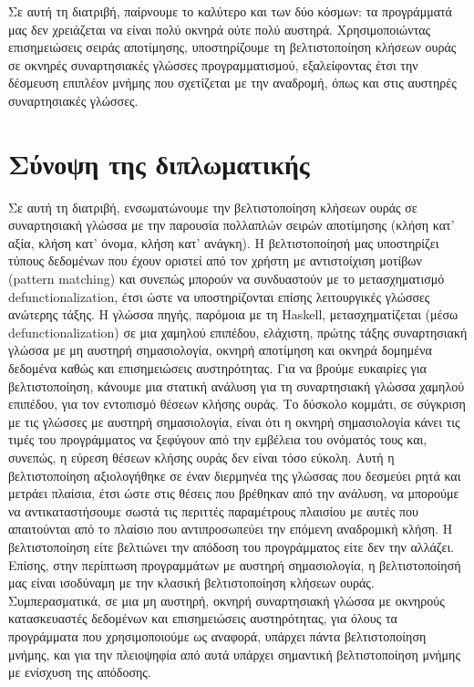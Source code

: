 \documentclass[diploma]{softlab-thesis}
\begin{document}
Σε αυτή τη διατριβή, παίρνουμε το καλύτερο και των δύο κόσμων: τα προγράμματά μας δεν χρειάζεται 
να είναι πολύ οκνηρά ούτε πολύ αυστηρά. Χρησιμοποιώντας επισημειώσεις σειράς αποτίμησης, υποστηρίζουμε τη 
βελτιστοποίηση κλήσεων ουράς σε οκνηρές
συναρτησιακές γλώσσες προγραμματισμού, εξαλείφοντας έτσι την δέσμευση επιπλέον μνήμης που σχετίζεται 
με την αναδρομή, όπως και στις αυστηρές συναρτησιακές γλώσσες.  


\section{Σύνοψη της διπλωματικής}

Σε αυτή τη διατριβή, ενσωματώνουμε την βελτιστοποίηση κλήσεων ουράς σε συναρτησιακή
γλώσσα με την παρουσία πολλαπλών σειρών αποτίμησης (κλήση κατ' αξία, κλήση κατ' όνομα, κλήση κατ' ανάγκη).
Η βελτιστοποίησή μας υποστηρίζει τύπους δεδομένων που έχουν οριστεί από τον χρήστη με αντιστοίχιση 
μοτίβων (pattern matching) και συνεπώς μπορούν να συνδυαστούν με το
μετασχηματισμό defunctionalization, έτσι ώστε να υποστηρίζονται επίσης λειτουργικές γλώσσες ανώτερης τάξης. 
Η γλώσσα πηγής, παρόμοια με τη Haskell,
μετασχηματίζεται (μέσω defunctionalization) σε μια χαμηλού επιπέδου, ελάχιστη, πρώτης τάξης συναρτησιακή 
γλώσσα
με μη αυστηρή σημασιολογία, οκνηρή αποτίμηση και οκνηρά δομημένα δεδομένα καθώς και επισημειώσεις 
αυστηρότητας. Για να βρούμε ευκαιρίες για βελτιστοποίηση, κάνουμε μια στατική ανάλυση για τη
συναρτησιακή γλώσσα χαμηλού επιπέδου, για τον εντοπισμό θέσεων κλήσης ουράς. Το δύσκολο κομμάτι,
σε σύγκριση με τις γλώσσες με αυστηρή σημασιολογία, είναι ότι η οκνηρή σημασιολογία κάνει τις τιμές 
του προγράμματος να ξεφύγουν από την εμβέλεια του ονόματός τους
και, συνεπώς, η εύρεση θέσεων κλήσης ουράς δεν είναι τόσο εύκολη. Αυτή η βελτιστοποίηση αξιολογήθηκε
σε έναν διερμηνέα της γλώσσας που δεσμεύει ρητά και μετράει πλαίσια, έτσι ώστε
στις θέσεις που βρέθηκαν από την ανάλυση, να μπορούμε να αντικαταστήσουμε σωστά τις περιττές παραμέτρους
πλαισίου με αυτές που απαιτούνται από το πλαίσιο που αντιπροσωπεύει την επόμενη αναδρομική κλήση.
Η βελτιστοποίηση είτε βελτιώνει την απόδοση του προγράμματος είτε δεν την αλλάζει. Επίσης, 
στην περίπτωση προγραμμάτων με αυστηρή σημασιολογία, η βελτιστοποίησή μας είναι ισοδύναμη με την κλασική 
βελτιστοποίηση κλήσεων ουράς. Συμπερασματικά,
σε μια μη αυστηρή, οκνηρή συναρτησιακή γλώσσα με οκνηρούς κατασκευαστές δεδομένων και 
επισημειώσεις αυστηρότητας, για όλους τα προγράμματα που χρησιμοποιούμε ως αναφορά, υπάρχει πάντα 
βελτιστοποίηση μνήμης, 
και για την πλειοψηφία
από αυτά υπάρχει σημαντική βελτιστοποίηση μνήμης με ενίσχυση της απόδοσης.
\end{document}
